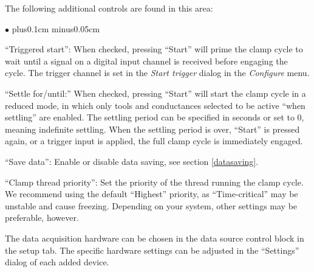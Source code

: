 \documentclass{article}
\newenvironment{myitem}{\begin{list}{$\bullet$}{\setlength{\leftmargin}{1.1em}
\itemsep0.1cm plus0.1cm minus0.05cm
\listparindent0cm
\addtolength{\labelsep}{0.5\labelsep}
\setlength{\labelwidth}{0.8em}
\setlength{\leftmargin}{\labelwidth}
\addtolength{\leftmargin}{\labelsep}
}}{\end{list}}
\begin{document}
The following additional controls are found in this area:
\begin{myitem}
	\item ``Triggered start'': When checked, pressing ``Start'' will prime the clamp cycle to wait
	until a signal on a digital input channel is received before engaging the cycle. The trigger channel
	is set in the \emph{Start trigger} dialog in the \emph{Configure} menu.
	\item ``Settle for/until:'' When checked, pressing ``Start'' will start the clamp cycle in a reduced
	mode, in which only tools and conductances selected to be active ``when settling'' are enabled.
	The settling period can be specified in seconds or set to 0, meaning indefinite settling. When the 
	settling period is over, ``Start'' is pressed again, or a trigger input is applied, the full clamp
	cycle is immediately engaged.
	\item ``Save data'': Enable or disable data saving, see section \ref{datasaving}.
	\item ``Clamp thread priority'': Set the priority of the thread running the clamp cycle. We recommend
	using the default ``Highest'' priority, as ``Time-critical'' may be unstable and cause freezing.
	Depending on your system, other settings may be preferable, however.
\end{myitem}

The data acquisition hardware can be chosen in the data source control block in the setup tab.
The specific hardware settings can be adjusted in the ``Settings'' dialog of each added device.
\end{document}
